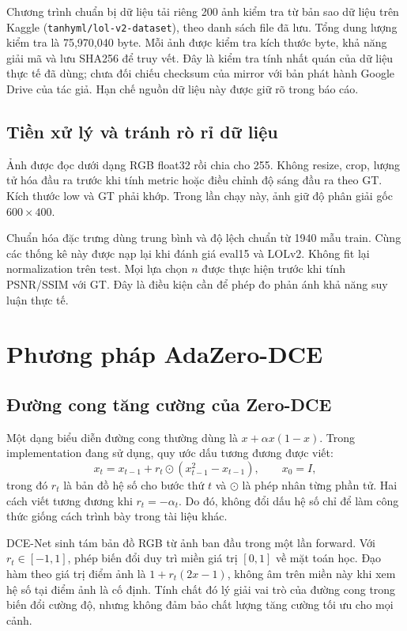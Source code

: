 Chương trình chuẩn bị dữ liệu tải riêng 200 ảnh kiểm tra từ bản sao dữ liệu trên Kaggle (\nolinkurl{tanhyml/lol-v2-dataset}), theo danh sách file đã lưu. Tổng dung lượng kiểm tra là 75,970,040 byte. Mỗi ảnh được kiểm tra kích thước byte, khả năng giải mã và lưu SHA256 để truy vết. Đây là kiểm tra tính nhất quán của dữ liệu thực tế đã dùng; chưa đối chiếu checksum của mirror với bản phát hành Google Drive của tác giả. Hạn chế nguồn dữ liệu này được giữ rõ trong báo cáo.

\subsection{Tiền xử lý và tránh rò rỉ dữ liệu}
Ảnh được đọc dưới dạng RGB float32 rồi chia cho 255. Không resize, crop, lượng tử hóa đầu ra trước khi tính metric hoặc điều chỉnh độ sáng đầu ra theo GT. Kích thước low và GT phải khớp. Trong lần chạy này, ảnh giữ độ phân giải gốc $600\times400$.

Chuẩn hóa đặc trưng dùng trung bình và độ lệch chuẩn từ 1940 mẫu train. Cùng các thống kê này được nạp lại khi đánh giá eval15 và LOLv2. Không fit lại normalization trên test. Mọi lựa chọn $n$ được thực hiện trước khi tính PSNR/SSIM với GT. Đây là điều kiện cần để phép đo phản ánh khả năng suy luận thực tế.

\section{Phương pháp AdaZero-DCE}
\subsection{Đường cong tăng cường của Zero-DCE}
Một dạng biểu diễn đường cong thường dùng là $x+\alpha x(1-x)$. Trong implementation đang sử dụng, quy ước dấu tương đương được viết:
\begin{equation}\label{eq:curve}
x_t=x_{t-1}+r_t\odot(x_{t-1}^{2}-x_{t-1}),\qquad x_0=I,
\end{equation}
trong đó $r_t$ là bản đồ hệ số cho bước thứ $t$ và $\odot$ là phép nhân từng phần tử. Hai cách viết tương đương khi $r_t=-\alpha_t$. Do đó, không đổi dấu hệ số chỉ để làm công thức giống cách trình bày trong tài liệu khác.

DCE-Net sinh tám bản đồ RGB từ ảnh ban đầu trong một lần forward. Với $r_t\in[-1,1]$, phép biến đổi duy trì miền giá trị $[0,1]$ về mặt toán học. Đạo hàm theo giá trị điểm ảnh là $1+r_t(2x-1)$, không âm trên miền này khi xem hệ số tại điểm ảnh là cố định. Tính chất đó lý giải vai trò của đường cong trong biến đổi cường độ, nhưng không đảm bảo chất lượng tăng cường tối ưu cho mọi cảnh.

